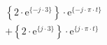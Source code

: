 \[
\begin{split}
&  \left \{ 2 \cdot \textrm{e}^{\{-j \cdot 3 \}} \right \} \cdot \textrm{e}^{\{- j \cdot \pi \cdot t \}}\\
& +\left \{ 2 \cdot \textrm{e}^{\{ j \cdot 3 \}} \right \} \cdot \textrm{e}^{\{  j \cdot \pi \cdot t \}}
\end{split}
\]
